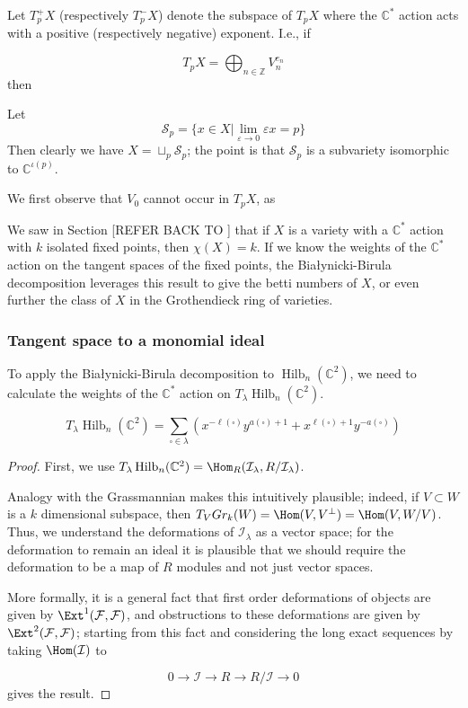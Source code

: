 \documentclass{amsart}[12pt]
\theoremstyle{definition}
\newcommand{\Z}{\mathbb{Z}}
\newcommand{\C}{\mathbb{C}}
\DeclareMathOperator{\Hilb}{Hilb}
\begin{document}
Let $T_p^+X$ (respectively $T_p^-X$) denote the subspace of $T_pX$ where the $\C^*$ action acts with a positive (respectively negative) exponent.  I.e., if

$$T_pX=\bigoplus_{n\in\Z} V_n^{e_n}$$
then

Let 
$$\mathcal{S}_p=\{x\in X|\lim_{\varepsilon\to 0} \varepsilon x=p\}$$
Then clearly we have $X=\sqcup_{p}\mathcal{S}_p$; the point is that $\mathcal{S}_p$ is a subvariety isomorphic to $\C^{\iota(p)}$.



We first observe that $V_0$ cannot occur in $T_pX$, as 

We saw in Section [REFER BACK TO ] that if $X$ is a variety with a $\C^*$ action with $k$ isolated fixed points, then $\chi(X)=k$.  If we know the weights of the $\C^*$ action on the tangent spaces of the fixed points, the Bia\l ynicki-Birula decomposition leverages this result to give the betti numbers of $X$, or even further the class of $X$ in the Grothendieck ring of varieties.

\subsubsection{Tangent space to a monomial ideal}
To apply the Bia\l ynicki-Birula decomposition to $\Hilb_n(\C^2)$, we need to calculate the weights of the $\C^*$ action on $T_\lambda\Hilb_n(\C^2)$.

\begin{Lemma}
$$T_\lambda \Hilb_n(\C^2)=\sum_{\square\in\lambda} \left(x^{-\ell(\square)} y^{a(\square)+1}+x^{\ell(\square)+1}y^{-a(\square)}\right)$$
\end{Lemma}

\begin{proof}

First, we use $T_\lambda\Hilb_n(\C^2)=\Hom_R(\mathcal{I}_\lambda,R/\mathcal{I}_\lambda)$.

Analogy with the Grassmannian makes this intuitively plausible; indeed, if $V\subset W$ is a $k$ dimensional subspace, then $T_V Gr_k(W)=\Hom(V, V^\perp)=\Hom(V, W/V)$.  Thus, we understand the deformations of $\mathcal{I}_\lambda$ as a vector space; for the deformation to remain an ideal it is plausible that we should require the deformation to be a map of $R$ modules and not just vector spaces.

More formally, it is a general fact that first order deformations of objects are given by $\Ext^1(\mathcal{F},\mathcal{F})$, and obstructions to these deformations are given by $\Ext^2(\mathcal{F},\mathcal{F})$; starting from this fact and considering the long exact sequences by taking $\Hom(\mathcal{I})$ to

$$0\to \mathcal{I}\to R\to R/\mathcal{I}\to 0$$
gives the result.




\end{proof}



\end{document}
